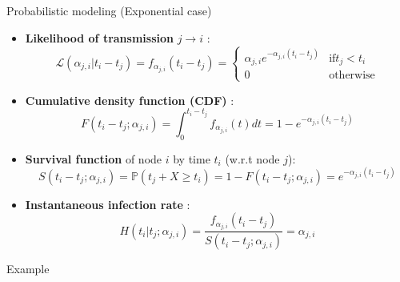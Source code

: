 \documentclass{beamer}
\begin{document}
\begin{frame}{Probabilistic modeling (Exponential case)}
\begin{itemize}
    \item \textbf{Likelihood of transmission} $j\rightarrow i$ : %
    \begin{equation}
    \mathscr{L}(\alpha_{j,i}|t_i-t_j) = f_{\alpha_{j,i}}(t_i-t_j) = \begin{cases}
    \alpha_{j,i} e^{-\alpha_{j,i}(t_i-t_j)}     &  \text{if} t_j < t_i\\
    0    & \text{otherwise}
    \end{cases}
\end{equation}
\item \textbf{Cumulative density function (CDF)} :
\begin{equation}
    F(t_i-t_j;\alpha_{j,i}) = \int_{0}^{t_i-t_j}f_{\alpha_{j,i}}(t)dt = 1-e^{-\alpha_{j,i}(t_i-t_j)}
\end{equation}
\item \textbf{Survival function} of node $i$ by time $t_i$ (w.r.t node $j$):
\begin{equation}
    S(t_i-t_j;\alpha_{j,i})=\mathds{P}(t_j + X \geq t_i) = 1-F(t_i-t_j;\alpha_{j,i}) = e^{-\alpha_{j,i}(t_i-t_j)}
\end{equation}
\item \textbf{Instantaneous infection rate} :
\begin{equation}
    H(t_i|t_j;\alpha_{j,i}) = \frac{f_{\alpha_{j,i}}(t_i-t_j)}{S(t_i-t_j;\alpha_{j,i})} = \alpha_{j,i}
\end{equation}
\end{itemize}
\end{frame}

\begin{frame}{Example}
\end{frame}
\end{document}
